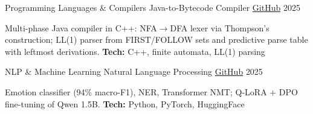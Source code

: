 \begin{cventries}
  \entrygap
  \cventry
    {Programming Languages \& Compilers}
    {Java-to-Bytecode Compiler}
    {\href{https://github.com/Ibrahimtareq952001/Compilar-Generator}{GitHub}}
    {2025}
    {
      \begin{cvitems}
        \item {Multi-phase Java compiler in C++: NFA$\rightarrow$DFA lexer via Thompson's construction; LL(1) parser from FIRST/FOLLOW sets and predictive parse table with leftmost derivations. \textbf{Tech:} C++, finite automata, LL(1) parsing}
      \end{cvitems}
    }

  \entrygap
  \cventry
    {NLP \& Machine Learning}
    {Natural Language Processing}
    {\href{https://github.com/Ibrahimtareq952001/Natural-Language-Processing-Labs}{GitHub}}
    {2025}
    {
      \begin{cvitems}
        \item {Emotion classifier (94\% macro-F1), NER, Transformer NMT; Q-LoRA + DPO fine-tuning of Qwen 1.5B. \textbf{Tech:} Python, PyTorch, HuggingFace}
      \end{cvitems}
    }


\end{cventries}

